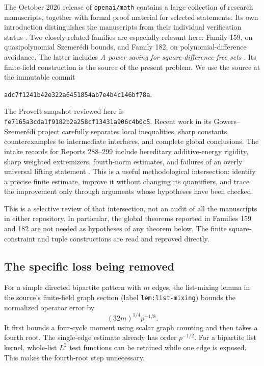 \documentclass[11pt,a4paper]{article}
\numberwithin{equation}{section}
\theoremstyle{definition}
\theoremstyle{remark}
\newcommand{\sourcecommit}{\texttt{adc7f1241b42e322a6451854ab7e4b4c146bf78a}}
\begin{document}
The October 2026 release of \texttt{openai/math} contains a large collection
of research manuscripts, together with formal proof material for selected
statements. Its own introduction distinguishes the manuscripts from their
individual verification status \cite{catalogue}. Two closely related
families are especially relevant here: Family 159, on quasipolynomial
Szemer\'edi bounds, and Family 182, on polynomial-difference avoidance.
The latter includes \emph{A power saving for square-difference-free sets}
\cite{square}. Its finite-field construction is the source of the present
problem. We use the source at the immutable commit
\begin{center}\small\sourcecommit.\end{center}

The ProveIt snapshot reviewed here is
\texttt{fe7165a3cda1f9182b2a258cf13431a906c4b0c5}.
Recent work in its Gowers--Szemer\'edi project carefully separates local
inequalities, sharp constants, counterexamples to intermediate interfaces,
and complete global conclusions. The intake records for Reports 288--299
include hereditary additive-energy rigidity, sharp weighted extremizers,
fourth-norm estimates, and failures of an overly universal lifting
statement \cite{proveit,energyintake,refinementsintake}. This is a useful
methodological intersection: identify a precise finite estimate, improve
it without changing its quantifiers, and trace the improvement only through
arguments whose hypotheses have been checked.

This is a selective review of that intersection, not an audit of all the
manuscripts in either repository. In particular, the global theorems
reported in Families 159 and 182 are not needed as hypotheses of any
theorem below. The finite square-constraint and tuple constructions are
read and reproved directly.

\subsection{The specific loss being removed}

For a simple directed bipartite pattern with $m$ edges, the list-mixing
lemma in the source's finite-field graph section \cite{square}
(label \texttt{lem:list-mixing}) bounds the normalized operator error by
\begin{equation}
 (32m)^{1/4}p^{-1/8}.
 \label{eq:old-bound}
\end{equation}
It first bounds a four-cycle moment using scalar graph counting and then
takes a fourth root. The single-edge estimate already has order
$p^{-1/2}$. For a bipartite list kernel, whole-list $L^2$ test functions
can be retained while one edge is exposed. This makes the fourth-root
step unnecessary.
\end{document}
